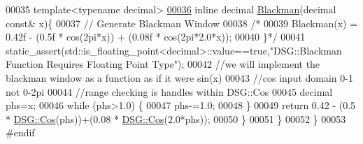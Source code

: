 \begin{DoxyCode}
00035 \textcolor{comment}{}        \textcolor{keyword}{template}<\textcolor{keyword}{typename} decimal>
\hypertarget{_blackman_8h_source_l00036}{}\hyperlink{namespace_d_s_g_1_1_window_a0800636ec7008aa75ff987feef5aafdf}{00036}         \textcolor{keyword}{inline} decimal \hyperlink{namespace_d_s_g_1_1_window_a0800636ec7008aa75ff987feef5aafdf}{Blackman}(decimal \textcolor{keyword}{const}& x)\{
00037             \textcolor{comment}{// Generate Blackman Window}
00038             \textcolor{comment}{/*}
00039 \textcolor{comment}{             Blackman(x) = 0.42f - (0.5f * cos(2pi*x)) + (0.08f * cos(2pi*2.0*x));}
00040 \textcolor{comment}{             \}*/}
00041             static\_assert(std::is\_floating\_point<decimal>::value==\textcolor{keyword}{true},\textcolor{stringliteral}{"DSG::Blackman Function Requires
       Floating Point Type"});
00042             \textcolor{comment}{//we will implement the blackman window as a function as if it were sin(x)}
00043             \textcolor{comment}{//cos input domain 0-1 not 0-2pi}
00044             \textcolor{comment}{//range checking is handles within DSG::Cos}
00045             decimal phs=x;
00046             \textcolor{keywordflow}{while} (phs>1.0) \{
00047                 phs-=1.0;
00048             \}
00049             \textcolor{keywordflow}{return} 0.42 - (0.5 * \hyperlink{namespace_d_s_g_ade303ad15c77f534429305c3cbd90191}{DSG::Cos}(phs))+(0.08 * \hyperlink{namespace_d_s_g_ade303ad15c77f534429305c3cbd90191}{DSG::Cos}(2.0*phs));
00050         \}
00051     \}
00052 \}
00053 \textcolor{preprocessor}{#endif}
\end{DoxyCode}

